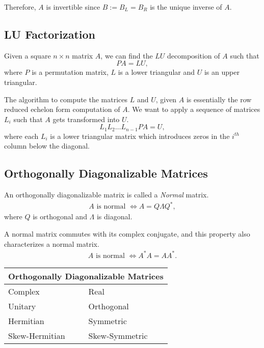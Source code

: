 \documentclass{amsart}
\theoremstyle{plain}
\numberwithin{equation}{section}
\begin{document}
Therefore, $A$ is invertible since $B := B_L = B_R$ is the 
unique inverse of $A$. 



\subsection{LU Factorization}
Given a square $n \times n$ matrix $A$, we can find the $LU$ decomposition 
of $A$ such that 
\begin{equation}
PA = LU,
\label{eq:LU}
\end{equation}
where $P$ is a permutation matrix, $L$ is a lower triangular
and $U$ is an upper triangular.

The algorithm to compute the matrices $L$ and $U$, given $A$ is 
essentially the row reduced echelon form computation of $A$. 
We want to apply a sequence of matrices $L_i$ such that 
$A$ gets transformed into $U$. 
\begin{equation}
L_1 L_2 \ldots L_{n-1} PA = U,
\label{}
\end{equation}
where each $L_i$ is a lower triangular matrix
which introduces zeros in the $i^{th}$ column
below the diagonal. 

\subsection{Orthogonally Diagonalizable Matrices}
An orthogonally diagonalizable matrix is called
a \emph{Normal} matrix. 
\begin{align*}
A \text{ is normal } \Leftrightarrow A = Q\Lambda Q^*,
\end{align*}
where $Q$ is orthogonal and $\Lambda$ is diagonal.

A normal matrix commutes with its complex conjugate, and 
this property also characterizes a normal matrix.
\begin{align*}
A \text{ is normal } \Leftrightarrow A^*A = AA^*.
\end{align*}

\begin{center}
\begin{tabular}{ |p{3cm}|p{3cm}| }
 \hline
 \multicolumn{2}{|c|}{ Orthogonally Diagonalizable Matrices }\\
 \hline
 Complex & Real \\
 \hline
 Unitary  & Orthogonal\\
 Hermitian & Symmetric\\
 Skew-Hermitian & Skew-Symmetric \\
 \hline
\end{tabular}
\end{center}
\end{document}
